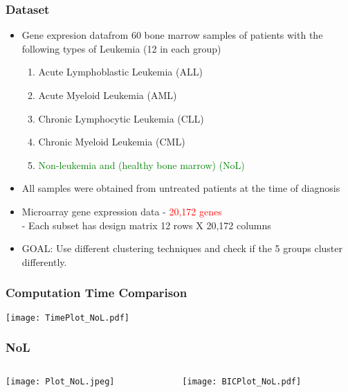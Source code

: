 \documentclass[10pt,dvipsnames,table]{beamer}
\begin{document}
\begin{frame}
\frametitle{Dataset}
\begin{itemize}
\item Gene expresion data\footnotemark from 60 bone marrow samples of patients with the following types of Leukemia (12 in each group)
\begin{enumerate}
\item Acute Lymphoblastic Leukemia (ALL)
\item Acute Myeloid Leukemia (AML)
\item Chronic Lymphocytic Leukemia (CLL)
\item Chronic Myeloid Leukemia (CML)
\item \textcolor{green}{Non-leukemia and (healthy bone marrow) (NoL)}
\end{enumerate}
\pause \item All samples were obtained from untreated patients at the time of diagnosis
\pause \item Microarray gene expression data - \textcolor{red}{20,172 genes} \\
\hspace{0.5cm} - Each subset has design matrix 12 rows X 20,172 columns
\pause \item GOAL: Use different clustering techniques and check if the 5 groups cluster differently.
\end{itemize}
\end{frame}

\begin{frame}
\frametitle{Computation Time Comparison}
\texttt{[image: TimePlot\_NoL.pdf]}
\end{frame}

\begin{frame}
\frametitle{NoL}
\begin{columns}
\begin{column}{5cm}
\texttt{[image: Plot\_NoL.jpeg]} \\
\end{column}
\begin{column}{5cm}
\pause \texttt{[image: BICPlot\_NoL.pdf]} \\
\end{column}
\end{columns}
\end{frame}
\end{document}
